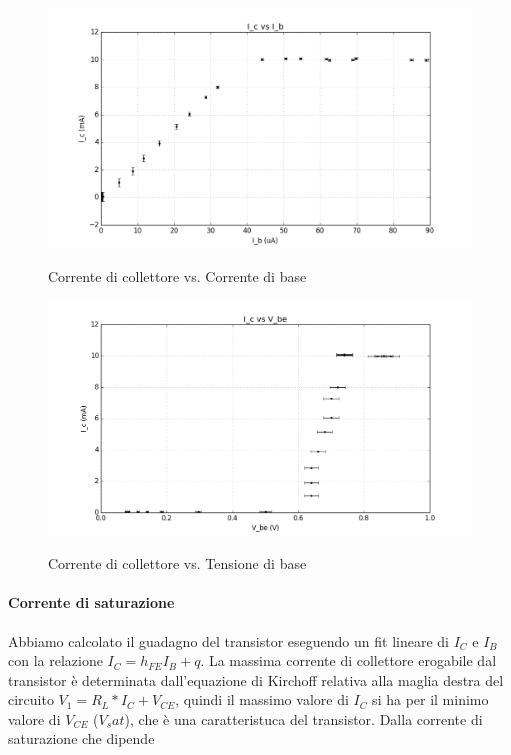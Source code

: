 \documentclass[10pt,a4paper]{article}
\begin{document}
\begin{figure}[!htb]
  \centering
  \includegraphics[scale=0.4]{IcIb.png} \label{IcIb}
\caption{Corrente di collettore vs. Corrente di base}
\label{circuito}
\end{figure}

\begin{figure}[!htb]
  \centering
  \includegraphics[scale=0.4]{IcVbe.png} \label{IcVbe}
\caption{Corrente di collettore vs. Tensione di base}
\label{circuito}
\end{figure}


\paragraph{Corrente di saturazione}
Abbiamo calcolato il guadagno del transistor  eseguendo un fit lineare di $I_C$ e $I_B$ con la  relazione $I_C=h_{FE}I_B+q$.
La massima corrente di collettore erogabile dal transistor è determinata dall'equazione di Kirchoff relativa alla maglia destra del circuito  $V_1 = R_L*I_C + V_{CE}$, quindi il massimo valore di $I_C$ si ha per il minimo valore di $V_{CE}$ ($V_sat$), che è una caratteristuca del transistor. Dalla corrente di saturazione che dipende 
  
\end{document}
